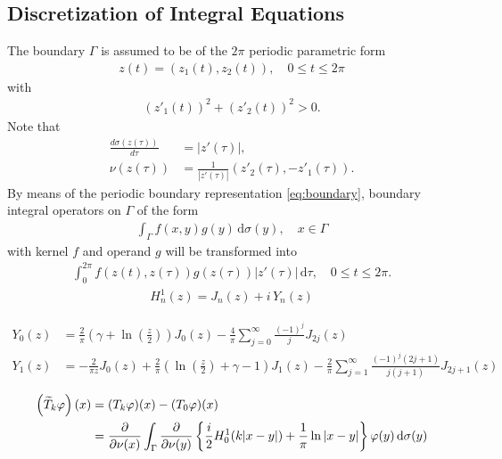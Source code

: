 \subsection{Discretization of Integral Equations}

The boundary $\Gamma$ is assumed to be of the $2\pi$ periodic parametric form
\begin{align}\label{eq:boundary}
  z(t) = (z_1(t), z_2(t)),\quad 0\leqslant t\leqslant 2\pi
\end{align}
with
\begin{align}
  (z'_1(t))^2 + (z'_2(t))^2 > 0.
\end{align}
Note that
\begin{subequations}
\begin{align}
  \frac{d\sigma(z(\tau))}{d\tau} &= |z'(\tau)|, \\
  \nu(z(\tau)) &= \frac{1}{|z'(\tau)|}(z'_2(\tau), -z'_1(\tau)).
\end{align}
\end{subequations}
By means of the periodic boundary representation \eqref{eq:boundary}, boundary integral operators on $\Gamma$ of the form
\begin{align*}
  \int_\Gamma f(x, y)g(y)\,\text{d}\sigma(y), \quad x\in\Gamma
\end{align*}
with kernel $f$ and operand $g$ will be transformed into
\begin{align*}
  \int_0^{2\pi} f(z(t), z(\tau))g(z(\tau))|z'(\tau)|\,\text{d}\tau, \quad 0\leqslant t\leqslant 2\pi.
\end{align*}
\begin{align}
  H_n^1(z) = J_n(z) + i\,Y_n(z)
\end{align}

\begin{equation}
\begin{split}
  Y_0(z) &= \frac{2}{\pi}\left(\gamma + \ln\left(\frac{z}{2}\right)\right)J_0(z)-\frac{4}{\pi}\sum_{j=0}^\infty\frac{(-1)^j}{j}J_{2j}(z) \\
  Y_1(z) &= -\frac{2}{\pi z}J_0(z) + \frac{2}{\pi}\left(\ln\left(\frac{z}{2}\right) + \gamma-1\right)J_1(z)-\frac{2}{\pi}\sum_{j=1}^\infty\frac{(-1)^j(2j+1)}{j(j+1)}J_{2j+1}(z)
\end{split}
\end{equation}

\begin{equation}
\begin{split}
  \left(\widetilde{T}_k\varphi\right)(x) &= (T_k\varphi)(x)-(T_0\varphi)(x) \\
  &= \frac{\partial}{\partial\nu(x)}\int_{\Gamma}\frac{\partial}{\partial\nu(y)}\left\{\frac{i}{2}H_0^1(k|x-y|) + \frac{1}{\pi}\ln|x-y|\right\}\varphi(y)\,\text{d}\sigma(y)
\end{split}
\end{equation}

